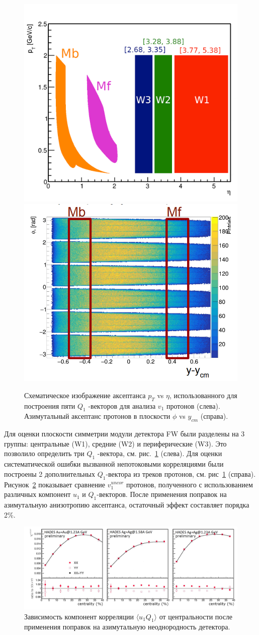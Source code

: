 \begin{figure}[h]
\begin{center}
  \includegraphics[width=0.37\linewidth]{images/eta_pt_qvectors.png}
   \includegraphics[width=0.39\linewidth]{images/hades_phi_rapidity.png}
   \caption{ Схематическое изображение аксептанса $p_T$ vs $\eta$, использованного для построения пяти  $Q_1$ -векторов для анализа $v_1$ протонов (слева).
   Азимутальный аксептанс  протонов в плоскости $\phi$  vs $y_{cm}$ (справа). }
\label{fig:hades_qvectors}
\end{center}
\end{figure}
%
Для оценки плоскости симметрии модули детектора FW были разделены на 3 группы: центральные (W1), средние (W2) и периферические (W3). 
Это позволило определить три $Q_1$ -вектора, см. рис.~\ref{fig:hades_qvectors} (слева).
Для оценки систематической ошибки вызванной непотоковыми корреляциями были построены 2 дополнительных $Q_1$-вектора из треков протонов, см. рис~\ref{fig:hades_qvectors} (справа).
Рисунок~\ref{fig:hades_uq_corr} показывает сравнение $v_1^{uncor}$ протонов, полученного с использованием различных компонент $u_1$ и $Q_1$-векторов. 
После применения поправок на азимутальную анизотропию аксептанса, остаточный эффект составляет порядка 2\%.\\
%
\begin{figure}[h]
\begin{center}
\includegraphics[width=0.75\linewidth]{images/hades_u1W1_centrality.png}
\caption{Зависимость компонент корреляции $\langle u_1 Q_1 \rangle$ от центральности после применения поправок на азимутальную неоднородность детектора.}
\label{fig:hades_uq_corr}
\end{center}
\end{figure}


